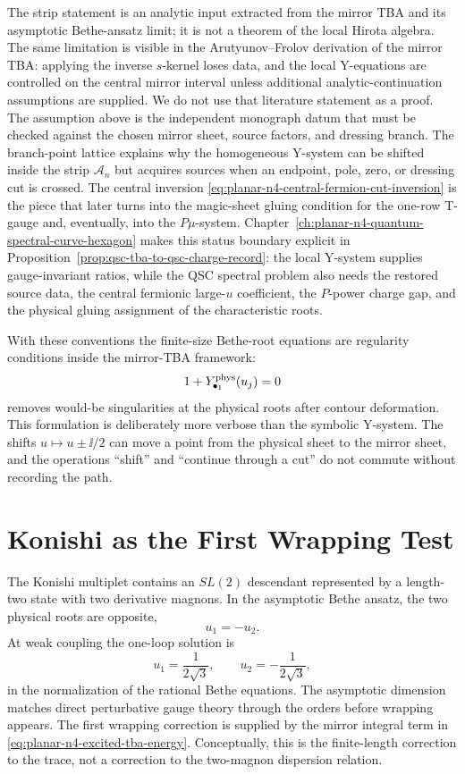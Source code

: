 The strip statement is an analytic input extracted from the mirror TBA and its
asymptotic Bethe-ansatz limit; it is not a theorem of the local Hirota algebra.
The same limitation is visible in the Arutyunov--Frolov derivation of the
mirror TBA: applying the inverse \(s\)-kernel loses data, and the local
Y-equations are controlled on the central mirror interval unless additional
analytic-continuation assumptions are supplied.  We do not use that literature
statement as a proof.  The assumption above is the independent monograph datum
that must be checked against the chosen mirror sheet, source factors, and
dressing branch.
The branch-point lattice explains why the homogeneous Y-system can be shifted
inside the strip \(\mathcal A_n\) but acquires sources when an endpoint, pole,
zero, or dressing cut is crossed.  The central inversion
\eqref{eq:planar-n4-central-fermion-cut-inversion} is the piece that later
turns into the magic-sheet gluing condition for the one-row T-gauge and,
eventually, into the \(P\mu\)-system.
Chapter~\ref{ch:planar-n4-quantum-spectral-curve-hexagon} makes this status
boundary explicit in Proposition~\ref{prop:qsc-tba-to-qsc-charge-record}: the
local Y-system supplies gauge-invariant ratios, while the QSC spectral problem
also needs the restored source data, the central fermionic large-\(u\)
coefficient, the \(P\)-power charge gap, and the physical gluing assignment of
the characteristic roots.

With these conventions the finite-size Bethe-root equations are regularity
conditions inside the mirror-TBA framework:
\[
  1+Y_{\bullet_1}^{\rm phys}(u_j)=0
\]
removes would-be singularities at the physical roots after contour
deformation.  This formulation is deliberately more verbose than the symbolic
Y-system.  The shifts \(u\mapsto u\pm\ii/2\) can move a point from the physical
sheet to the mirror sheet, and the operations ``shift'' and ``continue through
a cut'' do not commute without recording the path.

\section{Konishi as the First Wrapping Test}

The Konishi multiplet contains an \(SL(2)\) descendant represented by a
length-two state with two derivative magnons.  In the asymptotic Bethe ansatz,
the two physical roots are opposite,
\[
  u_1=-u_2.
\]
At weak coupling the one-loop solution is
\[
  u_1=\frac{1}{2\sqrt3},\qquad
  u_2=-\frac{1}{2\sqrt3},
\]
in the normalization of the rational Bethe equations.  The asymptotic
dimension matches direct perturbative gauge theory through the orders before
wrapping appears.  The first wrapping correction is supplied by the mirror
integral term in \eqref{eq:planar-n4-excited-tba-energy}.  Conceptually, this
is the finite-length correction to the trace, not a correction to the
two-magnon dispersion relation.

